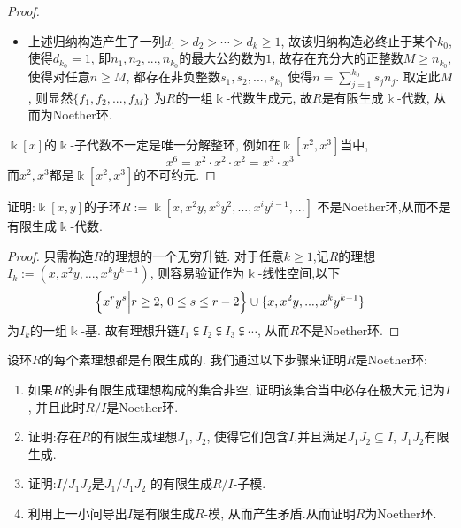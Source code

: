 \documentclass[oneside,a4papar,11pt,UTF8]{book}
\begin{document}
\begin{enumerate}
\begin{proof}
\begin{itemize}
    \item 上述归纳构造产生了一列$d_1>d_2>\cdots>d_k\geq 1$,
    故该归纳构造必终止于某个$k_0$,
    使得$d_{k_0}=1$,
    即$n_1,n_2,...,n_{k_0}$的最大公约数为$1$,
    故存在充分大的正整数$M\geq n_{k_0}$,
    使得对任意$n\geq M$,
    都存在非负整数$s_{1},s_2,...,s_{k_0}$
    使得$n=\sum_{j=1}^{k_0}s_jn_j$.
    取定此$M$,
    则显然$\{f_1,f_2,...,f_M\}$
    为$R$的一组$\Bbbk$-代数生成元,
    故$R$是有限生成$\Bbbk$-代数,
    从而为Noether环.
    \end{itemize}

    $\Bbbk[x]$的$\Bbbk$-子代数不一定是唯一分解整环,
    例如在$\Bbbk[x^2,x^3]$当中,
    \[x^6=x^2\cdot x^2\cdot x^2=x^3\cdot x^3\]
    而$x^2,x^3$都是$\Bbbk[x^2,x^3]$的不可约元.
  \end{proof}

  \begin{prob}\label{ex-15-1-10}
    证明:$\Bbbk[x,y]$的子环$R:=\Bbbk[x,x^2y,x^3y^2,...,x^iy^{i-1},...]$
    不是Noether环,从而不是有限生成$\Bbbk$-代数.
  \end{prob}

  \begin{proof}
    只需构造$R$的理想的一个无穷升链.
    对于任意$k\geq 1$,记$R$的理想
    $I_k:=(x,x^2y,...,x^ky^{k-1})$,
    则容易验证作为$\Bbbk$-线性空间,以下
    \[
    \Big\{ x^ry^s \Big| r\geq 2,\,0\leq s\leq r-2 \Big\}
    \cup\{x,x^2y,...,x^ky^{k-1}\}\]
    为$I_k$的一组$\Bbbk$-基.
    故有理想升链$I_1\subsetneqq I_2\subsetneqq I_3\subsetneqq\cdots$,
    从而$R$不是Noether环.
  \end{proof}

  \begin{prob}\label{ex-15-1-11}
    设环$R$的每个素理想都是有限生成的.
    我们通过以下步骤来证明$R$是Noether环:
      \begin{enumerate}
        \item 如果$R$的非有限生成理想构成的集合非空,
        证明该集合当中必存在极大元,记为$I$,
        并且此时$R/I$是Noether环.
        \item 证明:存在$R$的有限生成理想$J_1,J_2$,
        使得它们包含$I$,并且满足$J_1J_2\subseteq I$,
        $J_1J_2$有限生成.
        \item 证明:$I/J_1J_2$是$J_1/J_1J_2$
        的有限生成$R/I$-子模.
        \item 利用上一小问导出$I$是有限生成$R$-模,
        从而产生矛盾.从而证明$R$为Noether环.
      \end{enumerate}
  \end{prob}


\end{enumerate}
\end{document}
